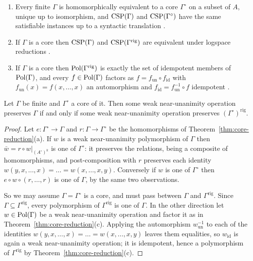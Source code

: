 \begin{theorem}\label{thm:core-reduction}
\begin{enumerate}\alphlabels\tightlist
\item Every finite $\Gamma$ is homomorphically equivalent to a core
  $\Gamma^{\circ}$ on a subset of $A$, unique up to isomorphism, and
  $\operatorname{CSP}(\Gamma)$ and $\operatorname{CSP}(\Gamma^{\circ})$ have the same satisfiable instances
  up to a syntactic translation \cite[Prop.~1.4.3]{BradyNotes}.
\item If $\Gamma$ is a core then $\operatorname{CSP}(\Gamma)$ and
  $\operatorname{CSP}(\Gamma^{\mathrm{rig}})$ are equivalent under logspace reductions
  \cite[Thm.~1.4.7]{BradyNotes}.
\item If $\Gamma$ is a core then $\operatorname{Pol}(\Gamma^{\mathrm{rig}})$ is exactly the
  set of idempotent members of $\operatorname{Pol}(\Gamma)$, and every $f\in\operatorname{Pol}(\Gamma)$
  factors as $f=f_{\mathrm{un}}\circ f_{\mathrm{id}}$ with
  $f_{\mathrm{un}}(x)=f(x,\dots,x)$ an automorphism and
  $f_{\mathrm{id}}=f_{\mathrm{un}}^{-1}\circ f$ idempotent
  \cite[Prop.~1.4.10, 1.4.11]{BradyNotes}.
\end{enumerate}
\end{theorem}

\begin{lemma}\label{lem:wnu-descends}
Let $\Gamma$ be finite and $\Gamma^{\circ}$ a core of it. Then some weak
near-unanimity operation preserves $\Gamma$ if and only if some weak
near-unanimity operation preserves $(\Gamma^{\circ})^{\mathrm{rig}}$.
\end{lemma}

\begin{proof}
Let $e\colon\Gamma^{\circ}\to\Gamma$ and $r\colon\Gamma\to\Gamma^{\circ}$ be
the homomorphisms of Theorem~\ref{thm:core-reduction}(a). If $w$ is a weak
near-unanimity polymorphism of $\Gamma$ then $\bar w=r\circ w|_{(A^{\circ})^{k}}$
is one of $\Gamma^{\circ}$: it preserves the relations, being a composite of
homomorphisms, and post-composition with $r$ preserves each identity
$w(y,x,\dots,x)=\dots=w(x,\dots,x,y)$. Conversely if $w$ is one of
$\Gamma^{\circ}$ then $e\circ w\circ(r,\dots,r)$ is one of $\Gamma$, by the
same two observations.

So we may assume $\Gamma=\Gamma^{\circ}$ is a core, and must pass between
$\Gamma$ and $\Gamma^{\mathrm{rig}}$. Since $\Gamma\subseteq
\Gamma^{\mathrm{rig}}$, every polymorphism of $\Gamma^{\mathrm{rig}}$ is one of
$\Gamma$. In the other direction let $w\in\operatorname{Pol}(\Gamma)$ be a weak
near-unanimity operation and factor it as in
Theorem~\ref{thm:core-reduction}(c). Applying the automorphism
$w_{\mathrm{un}}^{-1}$ to each of the identities
$w(y,x,\dots,x)=\dots=w(x,\dots,x,y)$ leaves them equalities, so
$w_{\mathrm{id}}$ is again a weak near-unanimity operation; it is idempotent,
hence a polymorphism of $\Gamma^{\mathrm{rig}}$ by
Theorem~\ref{thm:core-reduction}(c).
\end{proof}

